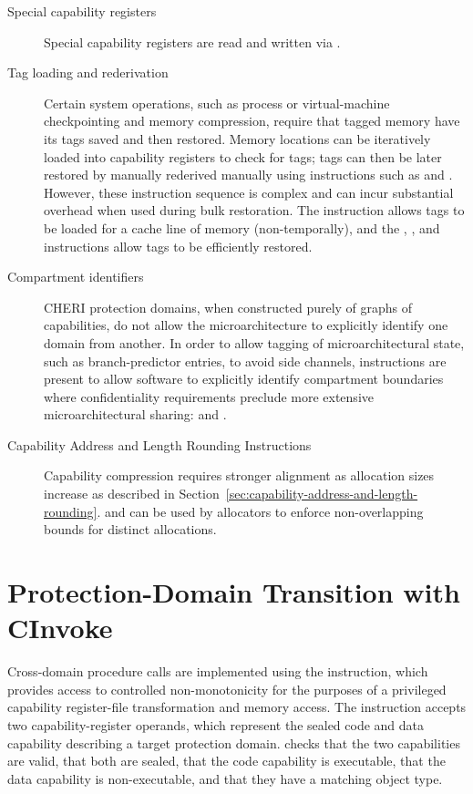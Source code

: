 \begin{description}
\item[Special capability registers]
Special capability registers are read and written via .

\item[Tag loading and rederivation]
Certain system operations, such as process or virtual-machine checkpointing
and memory compression, require that tagged memory have its tags saved and
then restored.
Memory locations can be iteratively loaded into capability registers to check
for tags; tags can then be later restored by manually rederived manually using
instructions such as  and .
However, these instruction sequence is complex and can incur substantial
overhead when used during bulk restoration.
The  instruction allows tags to be loaded for a cache
line of memory (non-temporally), and the ,
, and  instructions allow tags to
be efficiently restored.

\item[Compartment identifiers]
CHERI protection domains, when constructed purely of graphs of capabilities,
do not allow the microarchitecture to explicitly identify one domain from
another.
In order to allow tagging of microarchitectural state, such as
branch-predictor entries, to avoid side channels, instructions are present to
allow software to explicitly identify compartment boundaries where
confidentiality requirements preclude more extensive microarchitectural
sharing:  and .

\item[Capability Address and Length Rounding Instructions]
Capability compression requires stronger alignment as allocation
sizes increase  as described in
Section~\ref{sec:capability-address-and-length-rounding}.
 and  can be used by allocators to enforce
non-overlapping bounds for distinct allocations.
\end{description}

\section{Protection-Domain Transition with CInvoke}
\label{section:protection-domain-transition-with-cinvoke}

Cross-domain procedure calls are implemented using the 
instruction, which provides access to controlled non-monotonicity for the
purposes of a privileged capability register-file transformation and memory
access.
The instruction accepts two capability-register operands, which represent the
sealed code and data capability describing a target protection domain.
 checks that the two capabilities are valid, that both are
sealed, that the code capability is executable, that the data capability is
non-executable, and that they have a matching object type.

